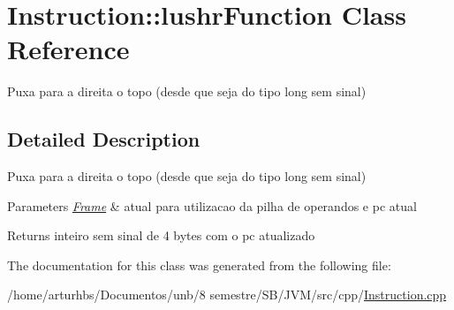 \hypertarget{classInstruction_1_1lushrFunction}{}\section{Instruction\+:\+:lushr\+Function Class Reference}
\label{classInstruction_1_1lushrFunction}


Puxa para a direita o topo (desde que seja do tipo long sem sinal)  




\subsection{Detailed Description}
Puxa para a direita o topo (desde que seja do tipo long sem sinal) 


\begin{DoxyParams}{Parameters}
{\em \hyperlink{classFrame}{Frame}} & atual para utilizacao da pilha de operandos e pc atual \\
\hline
\end{DoxyParams}
\begin{DoxyReturn}{Returns}
inteiro sem sinal de 4 bytes com o pc atualizado 
\end{DoxyReturn}


The documentation for this class was generated from the following file\+:\begin{DoxyCompactItemize}
\item 
/home/arturhbs/\+Documentos/unb/8 semestre/\+S\+B/\+J\+V\+M/src/cpp/\hyperlink{Instruction_8cpp}{Instruction.\+cpp}\end{DoxyCompactItemize}
